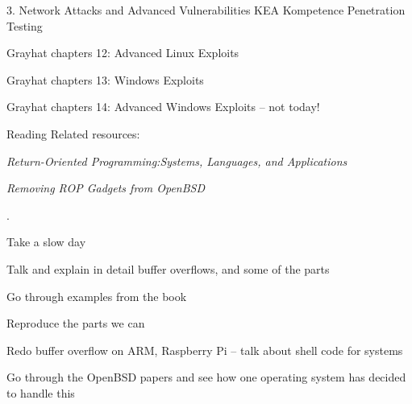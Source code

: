 \documentclass[Screen16to9,17pt]{foils}
\begin{document}
\mytitlepage
{3. Network Attacks and Advanced Vulnerabilities}
{KEA Kompetence Penetration Testing}









\begin{list2}
\item Grayhat chapters 12: Advanced Linux Exploits
\item Grayhat chapters 13: Windows Exploits
\item Grayhat chapters 14: Advanced Windows Exploits -- not today!
\end{list2}

Reading Related resources:
\begin{list2}
\item \emph{Return-Oriented Programming:Systems, Languages, and Applications}
\item \emph{Removing ROP Gadgets from OpenBSD}
\end{list2}




.

\begin{list1}
\item Take a slow day
\item Talk and explain in detail buffer overflows, and some of the parts
\item Go through examples from the book
\item Reproduce the parts we can
\item Redo buffer overflow on ARM, Raspberry Pi -- talk about shell code for systems
\item Go through the OpenBSD papers and see how one operating system has decided to handle this
\end{list1}
\end{document}
